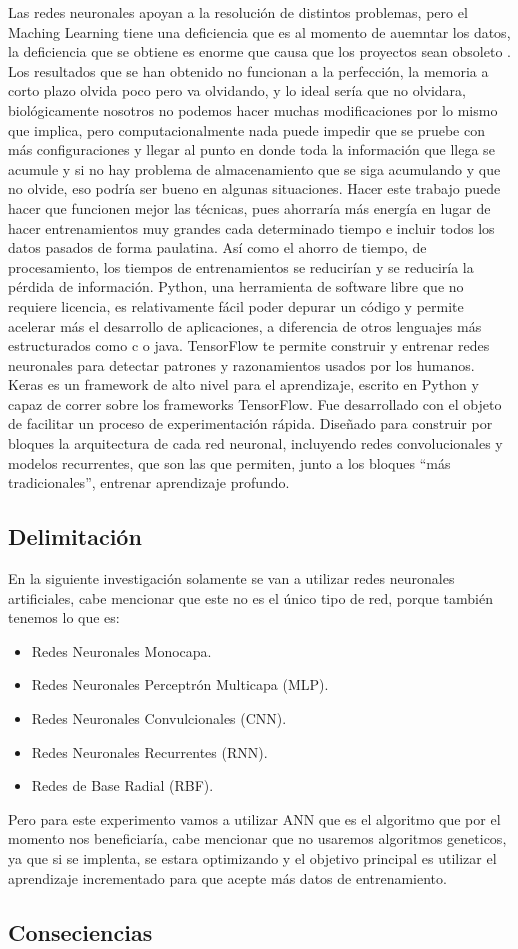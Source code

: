     Las redes neuronales apoyan a la resoluci\'on de distintos problemas, pero el Maching Learning tiene una deficiencia que es al momento de auemntar los datos, la deficiencia que se obtiene es enorme que causa que los proyectos sean obsoleto \cite{Bullinaria2009}. Los resultados que se han obtenido no funcionan a la perfección, la memoria a corto plazo olvida poco pero va olvidando,
    y lo ideal sería que no olvidara, biológicamente nosotros no podemos hacer muchas modificaciones \cite{TRAMONINEGRE2017} por lo mismo que implica, pero computacionalmente nada puede impedir que se pruebe con más configuraciones y llegar al punto en donde toda la información que llega se acumule y si no hay problema de almacenamiento que se siga acumulando y que no olvide, eso podría ser bueno en algunas situaciones.
    Hacer este trabajo puede hacer que funcionen mejor las técnicas, pues ahorraría más energía en lugar de hacer entrenamientos muy grandes cada determinado tiempo e incluir todos los datos pasados de forma paulatina. Así como el ahorro de tiempo, de procesamiento, los tiempos de entrenamientos se reducirían y se reduciría la pérdida de información.
    Python, una herramienta de software libre que no requiere licencia, es relativamente fácil poder depurar un código y permite acelerar más el desarrollo de aplicaciones,  a diferencia de otros lenguajes más estructurados como c o java.
    TensorFlow te permite construir y entrenar redes neuronales para detectar patrones y razonamientos usados por los humanos.
    Keras es un framework de alto nivel para el aprendizaje, escrito en Python y capaz de correr sobre los frameworks TensorFlow. Fue desarrollado con el objeto de facilitar un proceso de experimentación rápida. Diseñado para construir por bloques la arquitectura de cada red neuronal, incluyendo redes convolucionales y modelos recurrentes, que son las que permiten, junto a los bloques “más tradicionales”, entrenar aprendizaje profundo.

\subsection{Delimitación}
    
    En la siguiente investigación solamente se van a utilizar redes neuronales artificiales, cabe mencionar que este no es el único tipo de red, porque también tenemos lo que es:
    \begin{itemize}
        \item Redes Neuronales Monocapa.
        \item Redes Neuronales Perceptrón Multicapa (MLP).
        \item Redes Neuronales Convulcionales (CNN).
        \item Redes Neuronales Recurrentes (RNN).
        \item Redes de Base Radial (RBF).
    \end{itemize}
    Pero para este experimento vamos a utilizar ANN que es el algoritmo que por el momento nos beneficiaría, cabe mencionar que no usaremos algoritmos geneticos, ya que si se implenta, se estara
    optimizando y el objetivo principal es utilizar el aprendizaje incrementado para que acepte más datos de entrenamiento.

\subsection{Conseciencias}